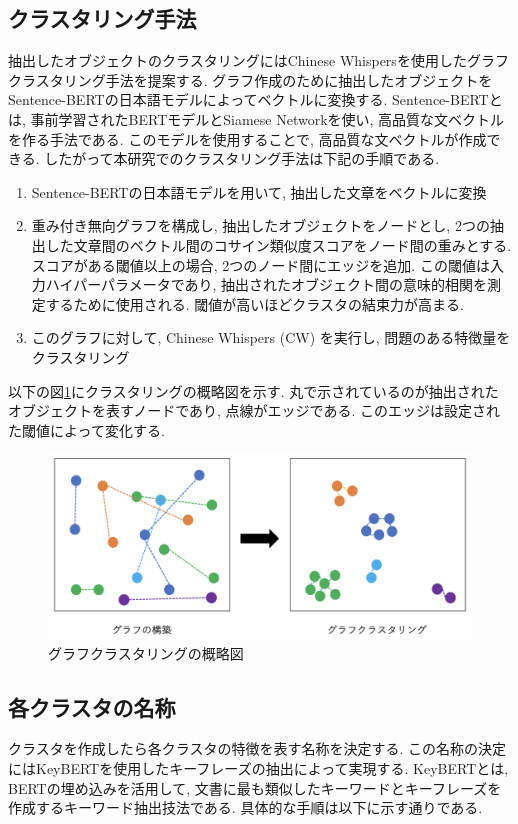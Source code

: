 \subsection{クラスタリング手法}
抽出したオブジェクトのクラスタリングにはChinese Whispers\cite{chinese-whispers}を使用したグラフクラスタリング手法を提案する. グラフ作成のために抽出したオブジェクトをSentence-BERTの日本語モデルによってベクトルに変換する. Sentence-BERT\cite{sentence-bert}とは, 事前学習されたBERTモデルとSiamese Networkを使い, 高品質な文ベクトルを作る手法である. このモデルを使用することで, 高品質な文ベクトルが作成できる. 
したがって本研究でのクラスタリング手法は下記の手順である. 
\begin{enumerate}
  \item Sentence-BERTの日本語モデルを用いて, 抽出した文章をベクトルに変換
  \item 重み付き無向グラフを構成し, 抽出したオブジェクトをノードとし, 2つの抽出した文章間のベクトル間のコサイン類似度スコアをノード間の重みとする. スコアがある閾値以上の場合, 2つのノード間にエッジを追加. この閾値は入力ハイパーパラメータであり, 抽出されたオブジェクト間の意味的相関を測定するために使用される. 閾値が高いほどクラスタの結束力が高まる. 
  \item このグラフに対して, Chinese Whispers (CW) を実行し, 問題のある特徴量をクラスタリング
\end{enumerate}

以下の図\ref{fig:clustering}にクラスタリングの概略図を示す. 丸で示されているのが抽出されたオブジェクトを表すノードであり, 点線がエッジである. このエッジは設定された閾値によって変化する. 
\begin{figure}[H]
  \centering
  \includegraphics[scale=0.4]
       {contents/images/clustering.png}
  \caption{グラフクラスタリングの概略図\label{fig:clustering}}
\end{figure}

\subsection{各クラスタの名称}
クラスタを作成したら各クラスタの特徴を表す名称を決定する. 
この名称の決定にはKeyBERT\cite{keybert}を使用したキーフレーズの抽出によって実現する. KeyBERTとは, BERTの埋め込みを活用して, 文書に最も類似したキーワードとキーフレーズを作成するキーワード抽出技法である. 
具体的な手順は以下に示す通りである. 

